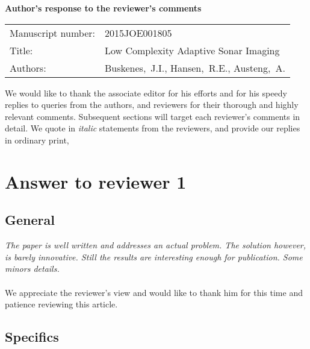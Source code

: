 \documentclass[11pt]{article} %
\newcommand\1{\vec 1}
\newcommand\q[1]{\textit{#1}}
\newcommand\ans[1]{#1}
\begin{document}

\begin{center}\Large\bf
Author's response to the reviewer's comments
\end{center}

\begin{center}
\begin{tabular}{l p{.6\linewidth}}\centering
Manuscript number: & 2015JOE001805 \\
Title: & Low Complexity Adaptive Sonar Imaging \\
Authors: & Buskenes,~J.I., Hansen,~R.E., Austeng,~A.
\end{tabular}
\end{center}

We would like to thank the associate editor for his efforts and for his speedy replies to queries from the authors, and reviewers for their thorough and highly relevant comments. Subsequent sections will target each reviewer's comments in detail. We quote in \textit{italic} statements from the reviewers, and provide our replies in ordinary print, 


\newpage
\section{Answer to reviewer 1}

\subsection*{General}

\q{The paper is well written and addresses an actual problem. The solution however, is barely innovative. Still the results are interesting enough for publication. Some minors details.} \\\\
\ans{We appreciate the reviewer's view and would like to thank him for this time and patience reviewing this article.}

\subsection*{Specifics}
\end{document}
